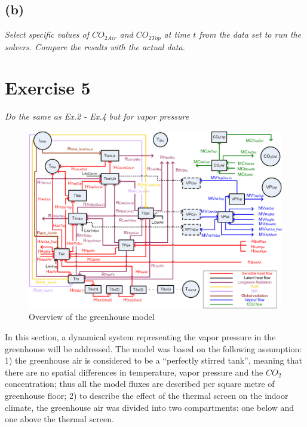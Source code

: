 \documentclass[a4paper]{article}
\begin{document}

\subsection{(b)}
\textit{Select specific values of \(CO_{2Air}\) and \(CO_{2Top}\) at time \(t\) from the data set to run the solvers. Compare the results with the actual data.}






\newpage
\section{Exercise 5}
\textit{Do the same as Ex.2 - Ex.4 but for vapor pressure}


\begin{figure}[H]
  \centering
  \includegraphics[width=\textwidth]{overview}
  \caption{Overview of the greenhouse model}\label{fig:overview}
\end{figure}

In this section, a dynamical system representing the vapor pressure in the greenhouse will be addressed.
The model was based on the following assumption:
1) the greenhouse air is considered to be a ``perfectly stirred tank'', meaning that there are no spatial differences in temperature, vapor pressure and the \(CO_2\) concentration; thus all the model fluxes are described per square metre of greenhouse floor;
2) to describe the effect of the thermal screen on the indoor climate, the greenhouse air was divided into two compartments: one below and one above the thermal screen.
\end{document}
